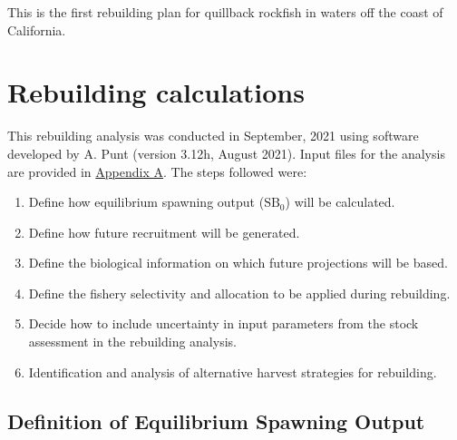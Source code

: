 \documentclass[11pt,
  english,
  a4paper,
]{article}
\begin{document}
\leavevmode\tagmcend\tagstructend


This is the first rebuilding plan for quillback rockfish in waters off the coast of California.

\leavevmode\tagmcend\tagstructend\par


\hypertarget{rebuilding-calculations}{%
\section{Rebuilding calculations}\label{rebuilding-calculations}}

\leavevmode\tagmcend\tagstructend


This rebuilding analysis was conducted in September, 2021 using software developed by A. Punt (version 3.12h, August 2021). Input files for the analysis are provided in {\protect\hyperlink{append_a}{Appendix A}\leavevmode\tagmcend\tagstructend}. The steps followed were:

\leavevmode\tagmcend\tagstructend\par

\begin{enumerate}
    \item Define how equilibrium spawning output ($\text{SB}_0$) will be calculated. 
    \item Define how future recruitment will be generated.
    \item Define the biological information on which future projections will be based.
    \item Define the fishery selectivity and allocation to be applied during rebuilding. 
    \item Decide how to include uncertainty in input parameters from the stock assessment in the rebuilding analysis. 
    \item Identification and analysis of alternative harvest strategies for rebuilding. 
\end{enumerate}


\hypertarget{definition-of-equilibrium-spawning-output}{%
\subsection{Definition of Equilibrium Spawning Output}\label{definition-of-equilibrium-spawning-output}}
\end{document}
